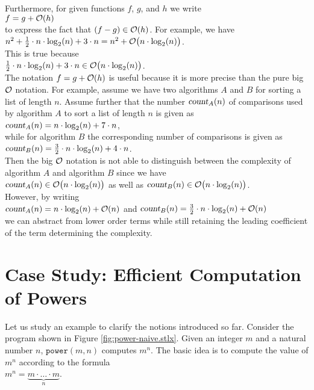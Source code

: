 Furthermore, for given functions $f$, $g$, and $h$ we write
\\[0.2cm]
\hspace*{1.3cm}
$f = g + \mathcal{O}(h)$
\\[0.2cm]
to express the fact that  $(f - g) \in \mathcal{O}(h)$.  For example, we have 
\\[0.2cm]
\hspace*{1.3cm}
$n^2 + \frac{1}{2} \cdot n \cdot \log_2(n) + 3 \cdot n = n^2 + \mathcal{O}\bigl(n \cdot \log_2(n)\bigr)$.
\\[0.2cm]
This is true because
\\[0.2cm]
\hspace*{1.3cm}
$\frac{1}{2} \cdot n \cdot \log_2(n) + 3 \cdot n \in \mathcal{O}\bigl(n \cdot \log_2(n)\bigr)$.
\\[0.2cm] 
The notation $f = g + \mathcal{O}(h)$ is useful because it is more precise than the pure big $\mathcal{O}$
notation.  For example, assume we have two algorithms $A$ and $B$ for sorting a list of length
$n$.  Assume further that the number $\textsl{count}_A(n)$ of comparisons used by algorithm $A$ to sort a list of
length $n$ is given as
\\[0.2cm]
\hspace*{1.3cm}
$\textsl{count}_A(n) = n \cdot \log_2(n) + 7 \cdot n$,
\\[0.2cm]
while for algorithm $B$ the corresponding number of comparisons is given as
\\[0.2cm]
\hspace*{1.3cm}
$\textsl{count}_B(n) = \frac{3}{2} \cdot n \cdot \log_2(n) + 4 \cdot n$.
\\[0.2cm]
Then the big $\mathcal{O}$ notation is not able to distinguish between the complexity of algorithm $A$ and
algorithm $B$ since we have
\\[0.2cm]
\hspace*{1.3cm}
$\textsl{count}_A(n) \in \mathcal{O}\bigl(n \cdot \log_2(n)\bigr)$ \quad as well as \quad
$\textsl{count}_B(n) \in \mathcal{O}\bigl(n \cdot \log_2(n)\bigr)$.
\\[0.2cm]
However, by writing
\\[0.2cm]
\hspace*{1.3cm}
$\textsl{count}_A(n) = n \cdot \log_2(n) + \mathcal{O}(n)$ \quad and \quad
$\textsl{count}_B(n) = \frac{3}{2} \cdot n \cdot \log_2(n) + \mathcal{O}(n)$
\\[0.2cm]
we can abstract from lower order terms while still retaining the leading coefficient of the term
determining the complexity.  

\section[Computation of Powers]{Case Study:  Efficient Computation of Powers}
Let us study an example to clarify the notions introduced so far.  
Consider the program shown in Figure \ref{fig:power-naive.stlx}.  Given an integer $m$ and a
natural number $n$, $\mathtt{power}(m, n)$ computes $m^n$.
The basic idea is to compute the value of $m^n$ according to the formula \\[0.2cm]
\hspace*{1.3cm} 
$m^n = \underbrace{m \cdot {\dots} \cdot m}_n$. 



